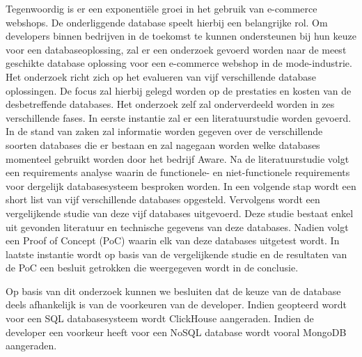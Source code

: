 Tegenwoordig is er een exponentiële groei in het gebruik van e-commerce webshops. De onderliggende database speelt hierbij een belangrijke rol. Om developers binnen bedrijven in de toekomst te kunnen ondersteunen bij hun keuze voor een databaseoplossing, zal er een onderzoek gevoerd worden naar de meest geschikte database oplossing voor een e-commerce webshop in de mode-industrie. Het onderzoek richt zich op het evalueren van vijf verschillende database oplossingen. De focus zal hierbij gelegd worden op de prestaties en kosten van de desbetreffende databases. Het onderzoek zelf zal onderverdeeld worden in zes verschillende fases. In eerste instantie zal er een literatuurstudie worden gevoerd. In de stand van zaken zal informatie worden gegeven over de verschillende soorten databases die er bestaan en zal nagegaan worden welke databases momenteel gebruikt worden door het bedrijf Aware. Na de literatuurstudie volgt een requirements analyse waarin de functionele- en niet-functionele requirements voor dergelijk databasesysteem besproken worden. In een volgende stap wordt een short list van vijf verschillende databases opgesteld. Vervolgens wordt een vergelijkende studie van deze vijf databases uitgevoerd. Deze studie bestaat enkel uit gevonden literatuur en technische gegevens van deze databases. Nadien volgt een Proof of Concept (PoC) waarin elk van deze databases uitgetest wordt. In laatste instantie wordt op basis van de vergelijkende studie en de resultaten van de PoC een besluit getrokken die weergegeven wordt in de conclusie.

\vspace{5mm}

Op basis van dit onderzoek kunnen we besluiten dat de keuze van de database deels afhankelijk is van de voorkeuren van de developer. Indien geopteerd wordt voor een SQL databasesysteem wordt ClickHouse aangeraden. Indien de developer een voorkeur heeft voor een NoSQL database wordt vooral MongoDB aangeraden.